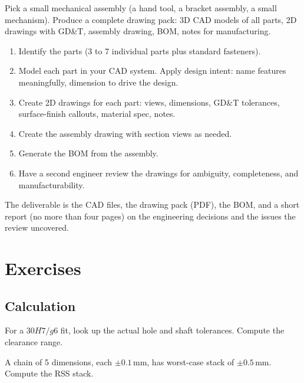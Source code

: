 \begin{project}
Pick a small mechanical assembly (a hand tool, a bracket assembly, a small mechanism). Produce a complete drawing pack: 3D CAD models of all parts, 2D drawings with GD\&T, assembly drawing, BOM, notes for manufacturing.

\begin{enumerate}[leftmargin=*]
  \item Identify the parts (3 to 7 individual parts plus standard fasteners).
  \item Model each part in your CAD system. Apply design intent: name features meaningfully, dimension to drive the design.
  \item Create 2D drawings for each part: views, dimensions, GD\&T tolerances, surface-finish callouts, material spec, notes.
  \item Create the assembly drawing with section views as needed.
  \item Generate the BOM from the assembly.
  \item Have a second engineer review the drawings for ambiguity, completeness, and manufacturability.
\end{enumerate}

The deliverable is the CAD files, the drawing pack (PDF), the BOM, and a short report (no more than four pages) on the engineering decisions and the issues the review uncovered.
\end{project}

\section{Exercises}

\subsection*{Calculation}

\begin{exercise}
For a $30H7/g6$ fit, look up the actual hole and shaft tolerances. Compute the clearance range.
\end{exercise}

\begin{exercise}
A chain of 5 dimensions, each $\pm 0.1\,\si{\milli\meter}$, has worst-case stack of $\pm 0.5\,\si{\milli\meter}$. Compute the RSS stack.
\end{exercise}

